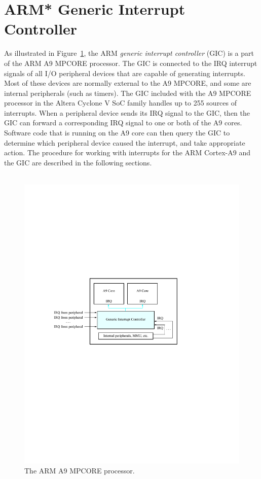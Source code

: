 \documentclass[11pt, twoside, pdftex]{article}
\begin{document}
\section{ARM* Generic Interrupt Controller}
As illustrated in Figure~\ref{fig:arm_MPCORE}, 
the ARM {\it generic interrupt controller} (GIC) is a part of the
ARM A9 MPCORE processor.  The GIC is connected to the IRQ interrupt signals of
all I/O peripheral devices that are capable of generating interrupts.  Most of these
devices are normally external to the A9 MPCORE, and some are internal peripherals (such as
timers). The GIC included
with the A9 MPCORE processor in the Altera Cyclone V SoC family handles up to 255 
sources of interrupts. When a peripheral device sends its IRQ signal to the GIC, then the
GIC can forward a corresponding IRQ signal to one or both of the A9 cores.
Software code that is running on the A9 core can then query the GIC to determine which 
peripheral device caused the interrupt, and take appropriate action. The procedure for 
working with interrupts for the ARM Cortex-A9 and the GIC are described in the following sections.
~\\
~\\
\begin{figure}[h!]
   \begin{center}
		 \includegraphics{figures/ARM_A9_GIC.pdf}
   \end{center}
   \caption{The ARM A9 MPCORE processor.}
	\label{fig:arm_MPCORE}
\end{figure}
\end{document}

